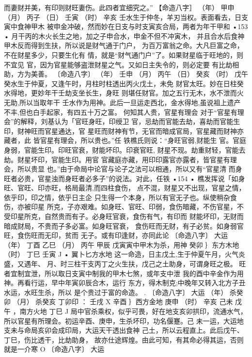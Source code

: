 而妻财并美，有印则财旺妻伤。此四者宜细究之。”
【命造八字］
（年） 甲申
（月） 丙子
（日） 壬寅
（时） 辛亥
壬水生于仲冬，羊刃当权。表面看去，日支寅中食神甲木
被申金冲破，然而妙在日支与时支寅亥合局，两者为年干甲和
•153 •
月干丙的木火长生之地，加之子申合水，申金不但不冲寅木，
并且合水后食神甲木反而得到生扶，所以说是财气通于门户，
为百万富翁之命。大凡巨富之命，不在财星多少，只要生化有
情，就是“财气通门户”了。如果财星临于旺地的，则不宜见
官，因为官星能够盗泄财星之气。又如日主失令的，则必定要
有比劫相助，方为美善。
〔命造八字〕
（年） 壬申
（月） 丙午
（日） 癸亥
（时） 戊午
癸水生于仲夏，又逢午时，月柱时柱透出丙火戊土，未免
财官太旺。妙在日柱癸水得地，更妙年干壬劫支坐长生，身旺
则堪任财官。加之五行无木，水不泄而火无助,所以当取年干
壬水作为用神。此后一旦运走西北，金水得地,虽说祖上遗产
不丰,但也白手起家，有四五十万之富。
何知其人贵，官星有理会
对于“官星有理会”的解释，刘基认为「官旺身旺，印绶卫
官，忌劫而官能去劫，喜劫而官能生印，财神旺而官星通达，官
星旺而财神有节，无官而暗成官局，官星藏而财神亦藏者，此
皆官星有理会，所以贵也。”任 铁樵氏则说：“身旺官弱,财能生
官。官庭身弱，官能生印。印旺官衰，财能坏印。印衰官旺,
财星不现。劫重财轻，官能去劫。财星坏印，官能生印。用官
官藏庭亦藏，用印印露官亦露者，皆官星有理会，所以贵显
也。”由于命局中论官与论子之法可以相通，所以又有“官星清
而身旺者必贵，官星浊而身旺者必多子”的说法。对此，任铁
•154 •
樵发挥说「如身旺、官旺、印亦旺，格局最清,而四柱食伤，
点不混，财星又不出现，官星之情，依乎印，印之情，依乎日主企
只生得一个本身，所以有官无子也。纵使稍杂食伤，亦被印星
所克，子亦艰难。如身旺、官旺、印弱，食伤暗藏，不伤官星，不
受印星所克，自然贵而有子。必身旺官衰，食伤有气，有印而
财能坏印，无财而暗成财局，不贵而子多必富。如身旺官衰，
食伤旺而无财，有子必贫。如身弱官旺，食伤旺而无印，贫而
无子。或有印逢财，亦同此论
〔命造八字〕 大运
（年） 丁酉 乙巳
（月） 丙午 甲辰
戊寅寅中甲木为杀，用神 癸卯 ｝东方木地
（时） 丁巳 壬寅 J •
翼卜匕方水地
这一命造，日主戊土,生于仲夏午月，火气炎盛，又遇年、
月、时三柱干支丙丁之火生扶，戊己之土助身，可谓身旺之极。
旺者宜制宜泄，所以取日支寅中制我的甲木七煞，或年支中泄
我的酉中辛金作为用神。再看行运，早中年寅卯辰合木，运行
东方，得木制克;中晚年又转入北方子丑水运，水旺生杀，所以
是个贵过于富的命造。 .
〔命造八字〕 大运
（年） 杀癸卯
（月） 杀癸亥
丁卯印
：
壬戌 X
辛酉 ｝西方金地
庚申
（时） 辛亥 己未
戊午 ，南方火地
丁巳 J
局中官杀乘权，似乎可畏，好在地支亥卯拱印，流通水气，
所以官星有所理会。初运辛酉、庚申，生杀坏印，功名偃蹇。己
未一运，大运地支未与命局亥卯会成印局，大运天干透出食神
己土，所以云程直上。此后戊午、丁巳，伤比透干，比劫助身，
故亦仕途辉煌。由此可知，有其命必得其运，否则就是一介寒
O
〔命造八字〕 大运
